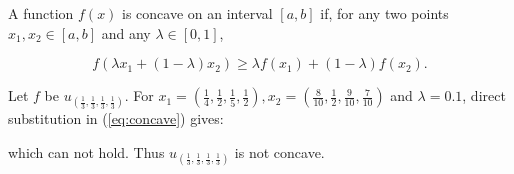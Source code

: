 A function \(f(x)\) is concave on an interval \([a, b]\) if, for any two
points \(x_1, x_2 \in [a, b]\) and any \(\lambda \in [0, 1]\), 

\begin{equation}\label{eq:concave}
f (\lambda x_1 + (1 - \lambda )x_2 ) \geq \lambda f (x_1 ) + (1 - \lambda )f (x_2 ).
\end{equation}

Let \(f\) be \(u_{(\frac{1}{3}, \frac{1}{3}, \frac{1}{3}, \frac{1}{3})}\).
For \(x_1 = (\frac{1}{4}, \frac{1}{2}, \frac{1}{5} , \frac{1}{2}),
x_2 = (\frac{8}{10}, \frac{1}{2}, \frac{9}{10} , \frac{7}{10})\) and
\(\lambda=0.1\), direct substitution in (\ref{eq:concave}) gives:


which can not hold. Thus \(u_{(\frac{1}{3}, \frac{1}{3}, \frac{1}{3}, \frac{1}{3})}\)
is not concave.